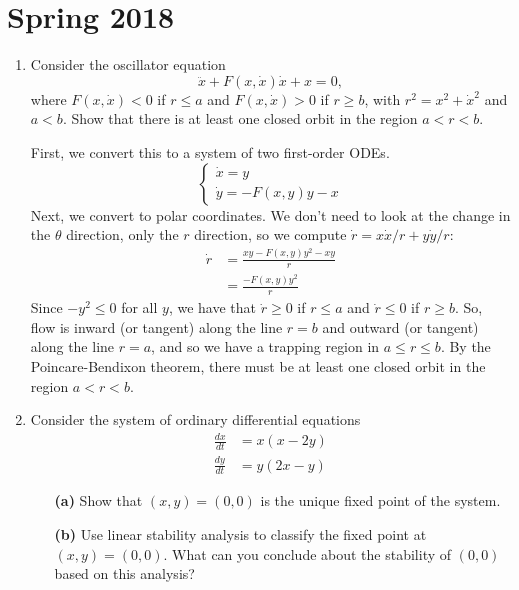 \documentclass[10pt,letterpaper]{report}
\renewcommand{\chaptermark}[1]{%
\markboth{#1}{}}
\begin{document}
\chapter*{Spring 2018}
\chaptermark{Spring 2018}

\begin{enumerate}
\item \begin{qbox}
Consider the oscillator equation
\[
\ddot x + F(x, \dot x)\dot x  + x = 0,
\]
where $F(x, \dot x) < 0$ if $r \leq a$ and $F(x, \dot x) > 0$ if $r \geq b$, with $r^2 = x^2 + \dot x^2$ and $a < b$. Show that there is at least one closed orbit in the region $a < r < b$.
\end{qbox}

First, we convert this to a system of two first-order ODEs.
\[
\begin{cases}
\dot x = y \\
\dot y = -F(x, y)y - x
\end{cases}
\]
Next, we convert to polar coordinates. We don't need to look at the change in the $\theta$ direction, only the $r$ direction, so we compute $\dot r = x\dot x / r + y \dot y / r$:
\begin{align*}
    \dot r &= \frac{xy - F(x,y)y^2 - xy}{r}
    \\
    &=\frac{- F(x,y)y^2}{r}
\end{align*}
Since $-y^2 \leq 0$ for all $y$, we have that $\dot r \geq 0$ if $r \leq a$ and $\dot r \leq 0$ if $r \geq b$. So, flow is inward (or tangent) along the line $r = b$ and outward (or tangent) along the line $r = a$, and so we have a trapping region in $a \leq r \leq b$. By the Poincare-Bendixon theorem, there must be at least one closed orbit in the region $a < r < b$.

\item \begin{qbox}
Consider the system of ordinary differential equations
\begin{align*}
    \frac{dx}{dt} &= x(x-2y) \\
    \frac{dy}{dt} &= y(2x - y)
\end{align*}
\begin{itemize}
    \item[\textbf{(a)}] Show that $(x, y) = (0, 0)$ is the unique fixed point of the system.
    
    \item[\textbf{(b)}] Use linear stability analysis to classify the fixed point at $(x, y) = (0, 0)$. What can you conclude about the stability of $(0, 0)$ based on this analysis?
    

\end{itemize}
\end{qbox}
\end{enumerate}
\end{document}
